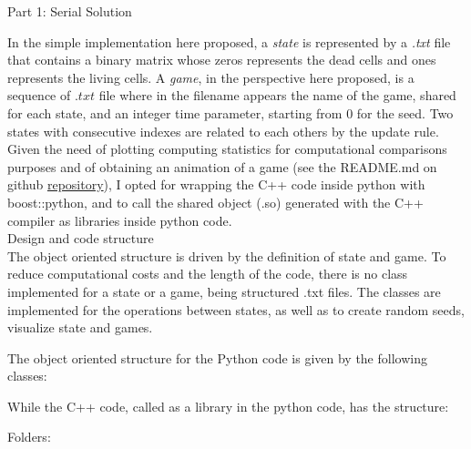 \documentclass[11pt, twoside]{article}
\begin{document}
\begin{center}
	\color{MidnightBlue} {\Large Part 1: Serial Solution }\color{Black} 
\end{center}

\noindent
In the simple implementation here proposed, a \emph{state} is represented by a \emph{.txt} file that contains a binary matrix whose zeros represents the dead cells and ones represents the living cells. A \emph{game}, in the perspective here proposed, is a sequence of $.txt$ file where in the filename appears the name of the game, shared for each state, and an integer time parameter, starting from $0$ for the seed. Two states with consecutive indexes are related to each others by the update rule.
Given the need of plotting computing statistics for computational comparisons purposes and of obtaining an animation of a game (see the README.md on github \href{https://github.com/SebastianoF/game_of_life}{repository}), I opted for wrapping the C++ code inside python with boost::python, and to call the shared object (.so) generated with the C++ compiler as libraries inside python code. \\

\noindent
\color{MidnightBlue} {\Large Design and code structure }\color{Black}  \\
The object oriented structure is driven by the definition of state and game. To reduce computational costs and the length of the code, there is no class implemented for a state or a game, being structured .txt files. The classes are implemented for the operations between states, as well as to create random seeds, visualize state and games.

The object oriented structure for the Python code is given by the following classes:


While the C++ code, called as a library in the python code, has the structure:


Folders:


\end{document}
